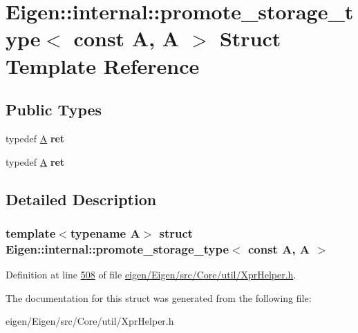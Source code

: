 \hypertarget{struct_eigen_1_1internal_1_1promote__storage__type_3_01const_01_a_00_01_a_01_4}{}\section{Eigen\+:\+:internal\+:\+:promote\+\_\+storage\+\_\+type$<$ const A, A $>$ Struct Template Reference}
\label{struct_eigen_1_1internal_1_1promote__storage__type_3_01const_01_a_00_01_a_01_4}
\subsection*{Public Types}
\begin{DoxyCompactItemize}
\item 
\mbox{\label{struct_eigen_1_1internal_1_1promote__storage__type_3_01const_01_a_00_01_a_01_4_a7135a092ef51abf165d7036c5b74084b}} 
typedef \hyperlink{group___core___module_class_eigen_1_1_matrix}{A} {\bfseries ret}
\item 
\mbox{\label{struct_eigen_1_1internal_1_1promote__storage__type_3_01const_01_a_00_01_a_01_4_a7135a092ef51abf165d7036c5b74084b}} 
typedef \hyperlink{group___core___module_class_eigen_1_1_matrix}{A} {\bfseries ret}
\end{DoxyCompactItemize}


\subsection{Detailed Description}
\subsubsection*{template$<$typename A$>$\newline
struct Eigen\+::internal\+::promote\+\_\+storage\+\_\+type$<$ const A, A $>$}



Definition at line \hyperlink{eigen_2_eigen_2src_2_core_2util_2_xpr_helper_8h_source_l00508}{508} of file \hyperlink{eigen_2_eigen_2src_2_core_2util_2_xpr_helper_8h_source}{eigen/\+Eigen/src/\+Core/util/\+Xpr\+Helper.\+h}.



The documentation for this struct was generated from the following file\+:\begin{DoxyCompactItemize}
\item 
eigen/\+Eigen/src/\+Core/util/\+Xpr\+Helper.\+h\end{DoxyCompactItemize}
